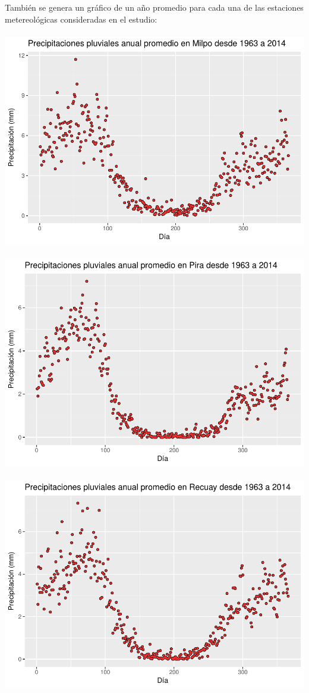 \documentclass{article}
\begin{document}
También se genera un gráfico de un año promedio para cada una de las
estaciones metereológicas consideradas en el estudio:\\\\
\includegraphics[width=\textwidth]{proyecto_files/unnamed-chunk-6-1.pdf}\\\\
\includegraphics[width=\textwidth]{proyecto_files/unnamed-chunk-6-2.pdf}\\\\
\includegraphics[width=\textwidth]{proyecto_files/unnamed-chunk-6-3.pdf}\\\\
\end{document}
